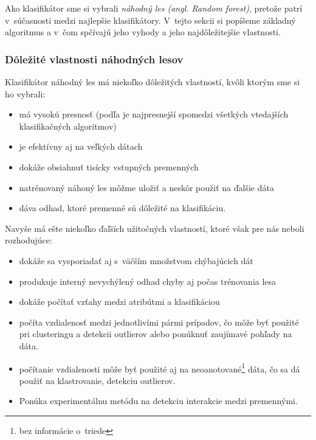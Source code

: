 

Ako klasifikátor sme si vybrali \textit{náhodný les (angl. Random forest)}, pretože patrí v~súčasnosti medzi najlepšie klasifikátory. V~tejto sekcii si popíšeme základný algoritmus a v~čom spčívajú jeho vyhody a jeho najdôležitejšie vlastnosti.


\subsubsection[Dôležité vlastnosti]{Dôležité vlastnosti náhodných lesov}
Klasifikátor náhodný les má niekoľko dôležitých vlastností, kvôli ktorým sme si ho vybrali:
\begin{itemize}
\item má vysokú presnosť (podľa \cite{randomForest} je najpresnejší spomedzi všetkých vtedajších klasifikačných algoritmov)
\item je efektívny aj na veľkých dátach
\item dokáže obsiahnuť tisícky vstupných premenných
\item natrénovaný náhoný les môžme uložiť a neskôr použiť na ďalšie dáta
\item dáva odhad, ktoré premenné sú dôležité na klasifikáciu.
\end{itemize}

Navyše má ešte niekoľko ďaľších užitočných vlastností, ktoré však pre nás neboli rozhodujúce:

\begin{itemize}
\item dokáže sa vysporiadať aj s~väčším množstvom chýbajúcich dát
\item produkuje interný nevychýlený odhad chyby aj počas trénovania lesa
\item dokáže počítať vzťahy medzi atribútmi a klasifikáciou
\item počíta vzdialenosť medzi jednotlivími pármi prípadov, čo môže byť použité pri clusteringu a detekcii outlierov alebo ponúknuť zaujímavé pohľady na dáta.
\item počítanie vzdialenosti môže byť použité aj na neoanotované\footnote{bez informácie o~triede} dáta, čo sa dá použiť na klastrovanie, detekciu outlierov.
\item Ponúka experimentálnu metódu na detekciu interakcie medzi premennými.
\end{itemize}

